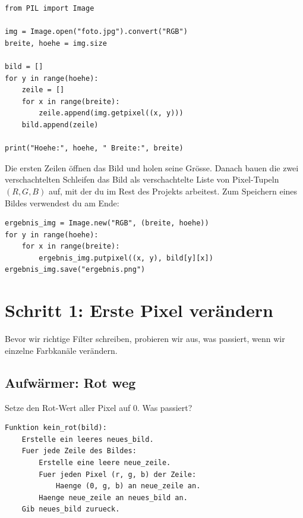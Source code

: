 \begin{lstlisting}
from PIL import Image

img = Image.open("foto.jpg").convert("RGB")
breite, hoehe = img.size

bild = []
for y in range(hoehe):
    zeile = []
    for x in range(breite):
        zeile.append(img.getpixel((x, y)))
    bild.append(zeile)

print("Hoehe:", hoehe, " Breite:", breite)
\end{lstlisting}

Die ersten Zeilen \"offnen das Bild und holen seine Gr\"osse. Danach
bauen die zwei verschachtelten Schleifen das Bild als verschachtelte
Liste von Pixel-Tupeln $(R, G, B)$ auf, mit der du im Rest des Projekts
arbeitest. Zum Speichern eines Bildes verwendest du am Ende:

\begin{lstlisting}
ergebnis_img = Image.new("RGB", (breite, hoehe))
for y in range(hoehe):
    for x in range(breite):
        ergebnis_img.putpixel((x, y), bild[y][x])
ergebnis_img.save("ergebnis.png")
\end{lstlisting}


\section{Schritt 1: Erste Pixel ver\"andern}

Bevor wir richtige Filter schreiben, probieren wir aus, was passiert, wenn
wir einzelne Farbkan\"ale ver\"andern.

\subsection*{Aufw\"armer: Rot weg}

Setze den Rot-Wert aller Pixel auf 0. Was passiert?

\begin{lstlisting}[style=pseudo]
Funktion kein_rot(bild):
    Erstelle ein leeres neues_bild.
    Fuer jede Zeile des Bildes:
        Erstelle eine leere neue_zeile.
        Fuer jeden Pixel (r, g, b) der Zeile:
            Haenge (0, g, b) an neue_zeile an.
        Haenge neue_zeile an neues_bild an.
    Gib neues_bild zurueck.
\end{lstlisting}


